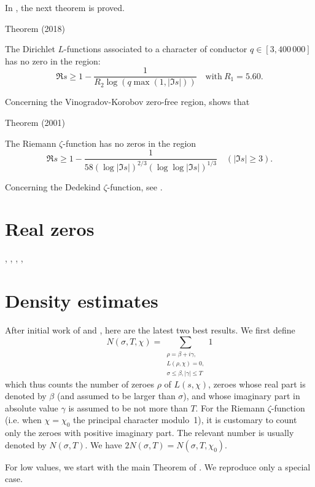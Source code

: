 In
\cite{Kadiri*18}, the next
theorem is proved.
\begin{thm}{Theorem (2018)}

  The Dirichlet $L$-functions associated to a character of conductor $q\in[3,400\,000]$ has
  no zero in the region:
  $$
    \Re s \ge 1- \frac1{R_2 \log(q \max(1,| \Im s|))}  \quad\text{with}\
    R_1=5.60. 
  $$
\end{thm}



Concerning the Vinogradov-Korobov zero-free region,
\cite{Ford*01}
shows that

\begin{thm}{Theorem (2001)}

  The Riemann $\zeta$-function has no zeros in the region
  $$
    \Re s\ge  1-\frac{1}{58(\log |\Im s|)^{2/3}(\log\log |\Im s|)^{1/3}}
    \quad(|\Im s|\ge 3).
  $$
\end{thm}


Concerning the Dedekind $\zeta$-function, see
\cite{Kadiri*12}.



\section{Real zeros}


\cite{Rosser*49},
\cite{Rosser*50},
\cite{Chua*05},
\cite{Watkins*00-1},

\section{Density estimates}


After initial work of
\cite{Chen-Wang*89-2}
and
\cite{Liu-Wang*02-1},
here are the latest two best results. We first define
$$
  N(\sigma,T,\chi)=\sum_{\substack{\rho=\beta+i\gamma,\\ L(\rho,\chi)=0,\\
      \sigma\le \beta, |\gamma|\le T}}1
$$
which thus counts the number of zeroes $\rho$ of $L(s,\chi)$, zeroes
whose real part is denoted by $\beta$ (and assumed to be larger than
$\sigma$), and whose imaginary part in absolute value $\gamma$ is assumed to be
not more than $T$. For the Riemann $\zeta$-function (i.e. when
$\chi=\chi_0$ the principal character modulo~1), it is customary
to count only the zeroes with positive imaginary part. The relevant
number is usually denoted by $N(\sigma,T)$. We have $2N(\sigma,T)=N(\sigma,T,\chi_0)$.

For low values, we start with the main Theorem of
\cite{Kadiri-Ng*12}.
We reproduce only a special case.

